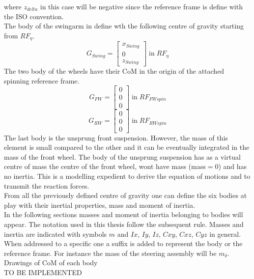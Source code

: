%
where $z_{delta}$ in this case will be negative since the reference frame is define with the ISO convention.\\
The body of the swingarm in define wth the following centre of gravity starting from $RF_\eta$.
%
\begin{equation}
    G_{Swing} =
    \left[
    \begin{array}{c}
        x_{Swing}\\
        0\\
        z_{Swing}
    \end{array}
    \right]
    \; \text{in} \; RF_{\eta}
\end{equation}
%
The two body of the wheels have their CoM in the origin of the attached spinning reference frame.
%
\begin{equation}
    G_{FW} =
    \left[
    \begin{array}{c}
        0\\
        0\\
        0
    \end{array}
    \right]
    \; \text{in} \; RF_{FWspin}
\end{equation}
%
\begin{equation}
    G_{RW} =
    \left[
    \begin{array}{c}
        0\\
        0\\
        0
    \end{array}
    \right]
    \; \text{in} \; RF_{RWspin}
\end{equation}
%
The last body is the unsprung front suspension. However, the mass of this element is small compared to the other and it can be eventually integrated in the mass of the front wheel. The body of the unsprung suspension has as a virtual centre of mass the centre of the front wheel, wont have mass (mass$=0$) and has no inertia. This is a modelling expedient to derive the equation of motions and to transmit the reaction forces.\\
From all the previously defined centre of gravity one can define the six bodies at play with their inertial properties, mass and moment of inertia.\\
In the following sections masses and moment of inertia belonging to bodies will appear. The notation used in this thesis follow the subsequent rule. Masses and inertia are indicated with symbols $m$ and $Ix$, $Iy$, $Iz$, $Cxy$, $Cxz$, $Cyz$ in general. When addressed to a specific one a suffix is added to represent the body or the reference frame. For instance the mass of the steering assembly will be $m_\delta$.\\
%
Drawings of CoM of each body\\
TO BE IMPLEMENTED 
%
